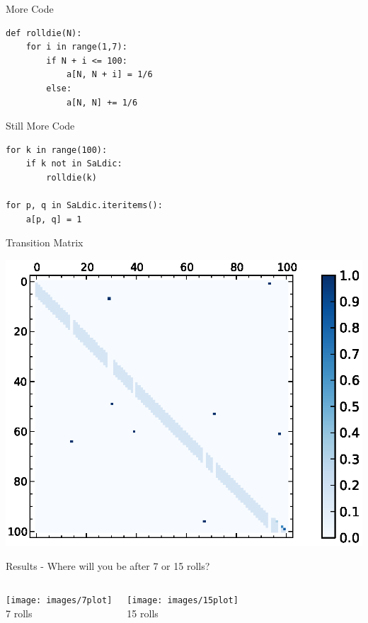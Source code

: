 \documentclass{beamer}
\begin{document}
\begin{frame}[fragile]{More Code}
  \begin{verbatim}
def rolldie(N):
    for i in range(1,7):
        if N + i <= 100:
            a[N, N + i] = 1/6
        else:
            a[N, N] += 1/6
  \end{verbatim}
\end{frame}

\begin{frame}[fragile]{Still More Code}
  \begin{verbatim}
for k in range(100):
    if k not in SaLdic:
        rolldie(k)

for p, q in SaLdic.iteritems():
    a[p, q] = 1
  \end{verbatim}
\end{frame}

\begin{frame}{Transition Matrix}
    \begin{center}
      \includegraphics[scale=0.8]{images/matplot}
    \end{center}
\end{frame}

\begin{frame}{Results - Where will you be after 7 or 15 rolls?}
  \begin{columns}
      \begin{center}
      \texttt{[image: images/7plot]}\\
      7 rolls
      \end{center}
      \begin{center}
      \texttt{[image: images/15plot]}\\
      15 rolls
      \end{center}
  \end{columns}
\end{frame}
\end{document}
